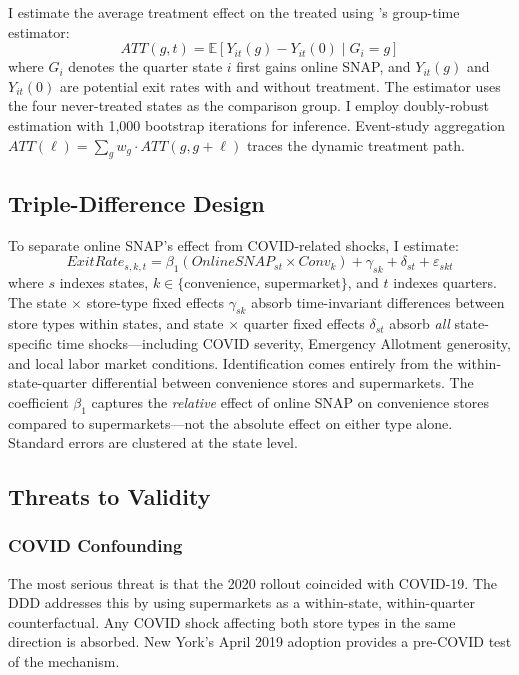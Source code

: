 \documentclass[12pt]{article}
\newcommand{\E}{\mathbb{E}}
\begin{document}
I estimate the average treatment effect on the treated using \citet{callaway_2021}'s group-time estimator:
\begin{equation}
ATT(g,t) = \E[Y_{it}(g) - Y_{it}(0) \mid G_i = g]
\end{equation}
where $G_i$ denotes the quarter state $i$ first gains online SNAP, and $Y_{it}(g)$ and $Y_{it}(0)$ are potential exit rates with and without treatment. The estimator uses the four never-treated states as the comparison group. I employ doubly-robust estimation with 1,000 bootstrap iterations for inference. Event-study aggregation $ATT(\ell) = \sum_g w_g \cdot ATT(g, g+\ell)$ traces the dynamic treatment path.

\subsection{Triple-Difference Design}

To separate online SNAP's effect from COVID-related shocks, I estimate:
\begin{equation}
ExitRate_{s,k,t} = \beta_1 (OnlineSNAP_{st} \times Conv_k) + \gamma_{sk} + \delta_{st} + \varepsilon_{skt}
\label{eq:ddd}
\end{equation}
where $s$ indexes states, $k \in \{$convenience, supermarket$\}$, and $t$ indexes quarters. The state $\times$ store-type fixed effects $\gamma_{sk}$ absorb time-invariant differences between store types within states, and state $\times$ quarter fixed effects $\delta_{st}$ absorb \emph{all} state-specific time shocks---including COVID severity, Emergency Allotment generosity, and local labor market conditions. Identification comes entirely from the within-state-quarter differential between convenience stores and supermarkets. The coefficient $\beta_1$ captures the \emph{relative} effect of online SNAP on convenience stores compared to supermarkets---not the absolute effect on either type alone. Standard errors are clustered at the state level.

\subsection{Threats to Validity}

\subsubsection*{COVID Confounding} The most serious threat is that the 2020 rollout coincided with COVID-19. The DDD addresses this by using supermarkets as a within-state, within-quarter counterfactual. Any COVID shock affecting both store types in the same direction is absorbed. New York's April 2019 adoption provides a pre-COVID test of the mechanism.
\end{document}
